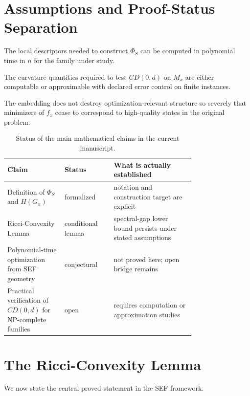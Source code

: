 \documentclass{svjour3}
\begin{document}
\section{Assumptions and Proof-Status Separation}
\begin{assumption}
The local descriptors needed to construct $\Phi_S$ can be computed in polynomial time in $n$ for the family under study.
\end{assumption}

\begin{assumption}
The curvature quantities required to test $CD(0,d)$ on $M_x$ are either computable or approximable with declared error control on finite instances.
\end{assumption}

\begin{assumption}
The embedding does not destroy optimization-relevant structure so severely that minimizers of $f_x$ cease to correspond to high-quality states in the original problem.
\end{assumption}

\begin{table}[t]
\centering
\small
\caption{Status of the main mathematical claims in the current manuscript.}
\label{tab:sef-status}
\small
\begin{tabular}{@{}p{0.24\linewidth}p{0.18\linewidth}p{0.34\linewidth}@{}}
\toprule
Claim & Status & What is actually established \\
\midrule
Definition of $\Phi_S$ and $H(G_x)$ & formalized & notation and construction target are explicit \\
Ricci-Convexity Lemma & conditional lemma & spectral-gap lower bound persists under stated assumptions \\
Polynomial-time optimization from SEF geometry & conjectural & not proved here; open bridge remains \\
Practical verification of $CD(0,d)$ for NP-complete families & open & requires computation or approximation studies \\
\bottomrule
\end{tabular}
\end{table}

\section{The Ricci-Convexity Lemma}
We now state the central proved statement in the SEF framework.
\end{document}
